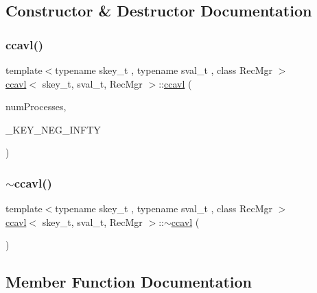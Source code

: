 \subsection{Constructor \& Destructor Documentation}
\mbox{\label{classccavl_ae75621f90c06705d71d42823ce27415b}} 
\subsubsection{\texorpdfstring{ccavl()}{ccavl()}}
{\footnotesize\ttfamily template$<$typename skey\+\_\+t , typename sval\+\_\+t , class Rec\+Mgr $>$ \\
\hyperlink{classccavl}{ccavl}$<$ skey\+\_\+t, sval\+\_\+t, Rec\+Mgr $>$\+::\hyperlink{classccavl}{ccavl} (\begin{DoxyParamCaption}\item[{const int}]{num\+Processes,  }\item[{const skey\+\_\+t \&}]{\+\_\+\+K\+E\+Y\+\_\+\+N\+E\+G\+\_\+\+I\+N\+F\+TY }\end{DoxyParamCaption})\hspace{0.3cm}{\ttfamily [inline]}}

\mbox{\label{classccavl_a4ef8b4a550508b4405c69c179d068346}} 
\subsubsection{\texorpdfstring{$\sim$ccavl()}{~ccavl()}}
{\footnotesize\ttfamily template$<$typename skey\+\_\+t , typename sval\+\_\+t , class Rec\+Mgr $>$ \\
\hyperlink{classccavl}{ccavl}$<$ skey\+\_\+t, sval\+\_\+t, Rec\+Mgr $>$\+::$\sim$\hyperlink{classccavl}{ccavl} (\begin{DoxyParamCaption}{ }\end{DoxyParamCaption})\hspace{0.3cm}{\ttfamily [inline]}}



\subsection{Member Function Documentation}
\mbox{\label{classccavl_a6515857749b20bf66903f66db6d33247}} 
